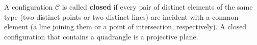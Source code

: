 A configuration $\mathcal{C}$ is called \textbf{closed} if every pair of distinct elements of the same type (two distinct points or two distinct lines) are incident with a common element (a line joining them or a point of intersection, respectively). A closed configuration that contains a quadrangle is a projective plane.
